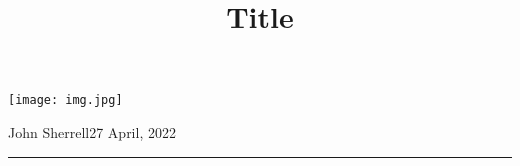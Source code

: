 \documentclass[11pt, letterpaper]{article}{\twocolumn}
\title{\vspace{-2.5em}Title\\\vspace{-.2em}{\normalsize \url{https://jomsh.cc}}}
\author{\vspace{-4em}}
\date{\vspace{-4em}}
\begin{document}
\maketitle
\vspace{-1.5em}

\begin{center}
\texttt{[image: img.jpg]}
\end{center}

\vspace{-1em}

John Sherrell\hfill{\small 27 April, 2022}

\hrule
\vspace{2em}

\thispagestyle{empty}

\blindtext

\blindtext

\blindtext

\blindtext
\end{document}
